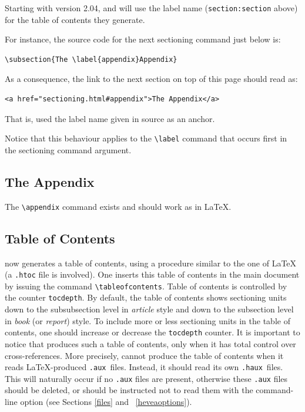 Starting with version 2.04, \hevea{} and \hacha{} will use the label name
(\verb+section:section+ above) for the table of  contents they generate.
\begin{htmlonly}
For instance, the source code for the next sectioning command just
below is:
\begin{verbatim}
\subsection{The \label{appendix}Appendix}
\end{verbatim}
As a consequence, the link to the next section on top
of this page should read as:
\begin{verbatim}
<a href="sectioning.html#appendix">The Appendix</a>
\end{verbatim}
That is, \hevea{} used the label name given in source as
an anchor.
\end{htmlonly}
Notice that this behaviour applies to the \verb+\label+ command
that occurs first in the sectioning command argument.

\subsection{The \label{appendix}Appendix}
The \verb+\appendix+ command exists and should work as in \LaTeX.

\subsection{Table of Contents}
%
%
\hevea{} now generates a table of contents, using a procedure similar
to the one of \LaTeX
(a \texttt{.htoc} file is involved).
One inserts this table of contents in the main document by issuing
the command \verb+\tableofcontents+.
Table of contents is controlled by the counter  \verb+tocdepth+.
By default, the table of contents shows sectioning units down to the
subsubsection level in \textit{article} style and down to the subsection level
in \textit{book} (or \textit{report}) style. To include more or less
sectioning units in the
table of contents, one should increase or decrease the \verb+tocdepth+
counter.
It is important to notice that \hevea{} produces such a table of
contents, only when it has total control over cross-references.
More precisely, \hevea{} cannot produce the table of contents when it
reads \LaTeX{}-produced \texttt{.aux}~files.
Instead, it should read its own \texttt{.haux}~files.
This will naturally occur if no \texttt{.aux} files are present,
otherwise these \texttt{.aux} files should be deleted, or \hevea{}
should be instructed not to read them with the command-line option
(see Sections \ref{files} and ~\ref{heveaoptions}).

